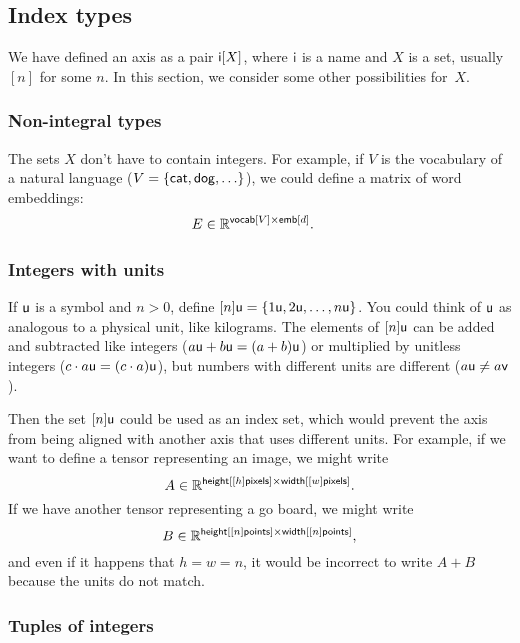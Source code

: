 \subsection{Index types}

We have defined an axis as a pair $\mathsf{i}[X]$, where $\mathsf{i}$ is a name and $X$ is a set, usually $[n]$ for some $n$. In this section, we consider some other possibilities for~$X$.

\subsubsection{Non-integral types}

The sets $X$ don't have to contain integers. For example, if $V$ is the vocabulary of a natural language ($V = \{ \mathsf{cat}, \mathsf{dog}, \ldots \}$), we could define a matrix of word embeddings:
\begin{align*}
  E &\in \mathbb{R}^{\mathsf{vocab}[V] \times \mathsf{emb}[d]}.
\end{align*}

\subsubsection{Integers with units}

If $\mathsf{u}$ is a symbol and $n > 0$, define $[n]\mathsf{u} = \{1\mathsf{u}, 2\mathsf{u}, \ldots, n\mathsf{u}\}$. You could think of $\mathsf{u}$ as analogous to a physical unit, like kilograms. The elements of $[n]\mathsf{u}$ can be added and subtracted like integers ($a\mathsf{u} + b\mathsf{u} = (a+b)\mathsf{u}$) or multiplied by unitless integers ($c \cdot a\mathsf{u} = (c \cdot a) \mathsf{u}$), but numbers with different units are different ($a \mathsf{u} \neq a \mathsf{v}$).

Then the set $[n]\mathsf{u}$ could be used as an index set, which would prevent the axis from being aligned with another axis that uses different units. For example, if we want to define a tensor representing an image, we might write
\[ A \in \mathbb{R}^{\mathsf{height}[[h]\mathsf{pixels}] \times \mathsf{width}[[w]\mathsf{pixels}]}. \]
If we have another tensor representing a go board, we might write
\[ B \in \mathbb{R}^{\mathsf{height}[[n]\mathsf{points}] \times \mathsf{width}[[n]\mathsf{points}]}, \]
and even if it happens that $h = w = n$, it would be incorrect to write $A+B$ because the units do not match.

\subsubsection{Tuples of integers}

